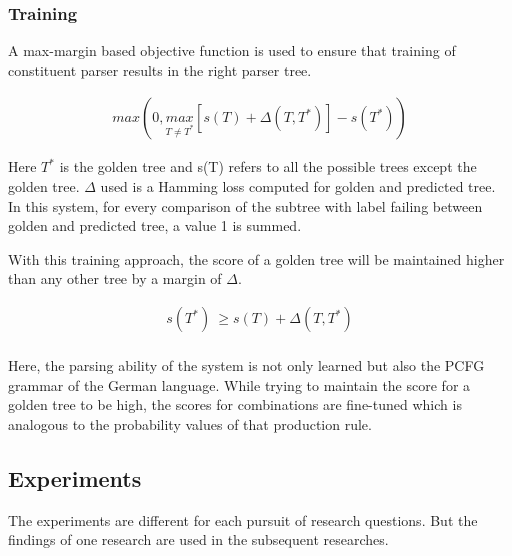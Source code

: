 \documentclass[a4paper, 11pt]{article}
\begin{document}
\subsubsection{Training}

A max-margin based objective function is used to ensure that training of constituent parser results in the right parser tree.

\begin{align*}
max\left(0, \underset{T\neq{T^*}}{max}\left[s(T) + \Delta(T,T^*)\right] - s(T^*)\right)
\end{align*}

Here $T^*$ is the golden tree and s(T) refers to all the possible trees except the golden tree. $\Delta$ used is a Hamming loss computed for golden and predicted tree. In this system, for every comparison of the subtree with label failing between golden and predicted tree, a value 1 is summed.

With this training approach, the score of a golden tree will be maintained higher than any other tree by a margin of $\Delta$.  

\begin{align*}
s(T^*)\ \geq s(T) + \Delta (T,T^*) \\
\end{align*}

Here, the parsing ability of the system is not only learned but also the PCFG grammar of the German language. While trying to maintain the score for a golden tree to be high, the scores for combinations are fine-tuned which is analogous to the probability values of that production rule.

\subsection{Experiments}

The experiments are different for each pursuit of research questions. But the findings of one research are used in the subsequent researches. 
\end{document}

